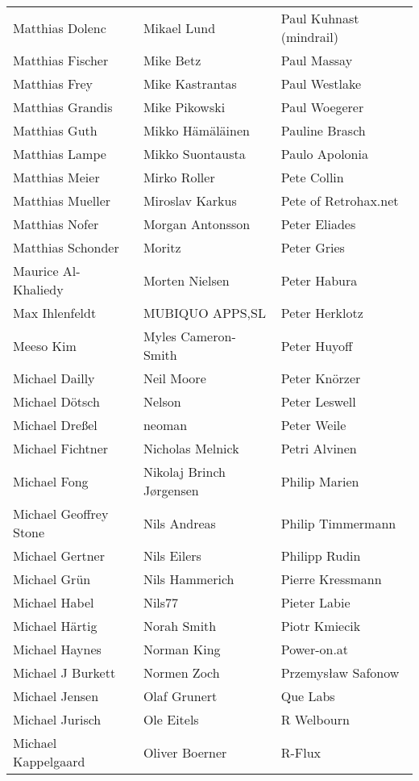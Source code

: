 \begin{small}
\begin{tabular}{p{4cm}p{4cm}p{4cm}}
Matthias Dolenc & Mikael Lund & Paul Kuhnast (mindrail) \\
Matthias Fischer & Mike Betz & Paul Massay \\
Matthias Frey & Mike Kastrantas & Paul Westlake \\
Matthias Grandis & Mike Pikowski & Paul Woegerer \\
Matthias Guth & Mikko Hämäläinen & Pauline Brasch \\
Matthias Lampe & Mikko Suontausta & Paulo Apolonia \\
Matthias Meier & Mirko Roller & Pete Collin \\
Matthias Mueller & Miroslav Karkus & Pete of Retrohax.net \\
Matthias Nofer & Morgan Antonsson & Peter Eliades \\
Matthias Schonder & Moritz & Peter Gries \\
Maurice Al-Khaliedy & Morten Nielsen & Peter Habura \\
Max Ihlenfeldt & MUBIQUO APPS,SL & Peter Herklotz \\
Meeso Kim & Myles Cameron-Smith & Peter Huyoff \\
Michael Dailly & Neil Moore & Peter Knörzer \\
Michael Dötsch & Nelson & Peter Leswell \\
Michael Dreßel & neoman & Peter Weile \\
Michael Fichtner & Nicholas Melnick & Petri Alvinen \\
Michael Fong & Nikolaj Brinch Jørgensen & Philip Marien \\
Michael Geoffrey Stone & Nils Andreas & Philip Timmermann \\
Michael Gertner & Nils Eilers & Philipp Rudin \\
Michael Grün & Nils Hammerich & Pierre Kressmann \\
Michael Habel & Nils77 & Pieter Labie \\
Michael Härtig & Norah Smith & Piotr Kmiecik \\
Michael Haynes & Norman King & Power-on.at \\
Michael J Burkett & Normen Zoch & Przemysław Safonow \\
Michael Jensen & Olaf Grunert & Que Labs \\
Michael Jurisch & Ole Eitels & R Welbourn \\
Michael Kappelgaard & Oliver Boerner & R-Flux \\

\end{tabular}
\end{small}
